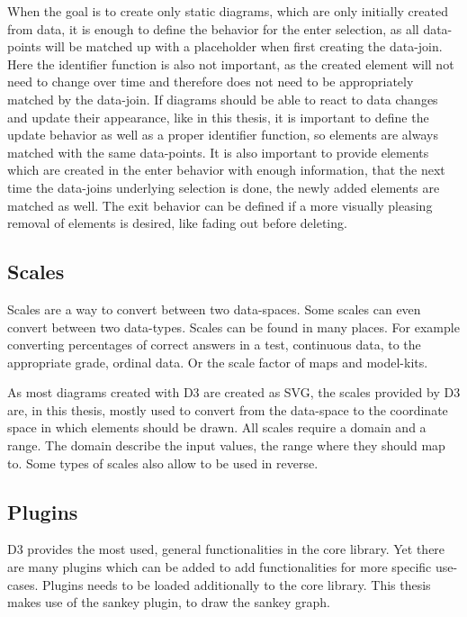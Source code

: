 When the goal is to create only static diagrams, which are only initially created from data, it is enough to define the behavior for the enter selection, as all data-points will be matched up with a placeholder when first creating the data-join. Here the identifier function is also not important, as the created element will not need to change over time and therefore does not need to be appropriately matched by the data-join. If diagrams should be able to react to data changes and update their appearance, like in this thesis, it is important to define the update behavior as well as a proper identifier function, so elements are always matched with the same data-points. It is also important to provide elements which are created in the enter behavior with enough information, that the next time the data-joins underlying selection is done, the newly added elements are matched as well. The exit behavior can be defined if a more visually pleasing removal of elements is desired, like fading out before deleting.


\subsection{Scales}

Scales are a way to convert between two data-spaces. Some scales can even convert between two data-types. Scales can be found in many places. For example converting percentages of correct answers in a test, continuous data, to the appropriate grade, ordinal data. Or the scale factor of maps and model-kits.

As most diagrams created with D3 are created as SVG, the scales provided by D3 are, in this thesis, mostly used to convert from the data-space to the coordinate space in which elements should be drawn. All scales require a domain and a range. The domain describe the input values, the range where they should map to. Some types of scales also allow to be used in reverse. 

\subsection{Plugins}

D3 provides the most used, general functionalities in the core library. Yet there are many plugins which can be added to add functionalities for more specific use-cases. Plugins needs to be loaded additionally to the core library. This thesis makes use of the sankey plugin\cite{sankey_package}, to draw the sankey graph.
